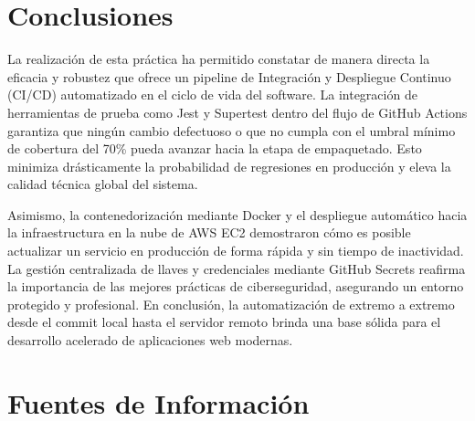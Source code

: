 \documentclass[12pt,letterpaper]{article}
\begin{document}
\newpage

\section{Conclusiones}

La realización de esta práctica ha permitido constatar de manera directa la eficacia y robustez que ofrece un pipeline de Integración y Despliegue Continuo (CI/CD) automatizado en el ciclo de vida del software. La integración de herramientas de prueba como Jest y Supertest dentro del flujo de GitHub Actions garantiza que ningún cambio defectuoso o que no cumpla con el umbral mínimo de cobertura del 70\% pueda avanzar hacia la etapa de empaquetado. Esto minimiza drásticamente la probabilidad de regresiones en producción y eleva la calidad técnica global del sistema.

Asimismo, la contenedorización mediante Docker y el despliegue automático hacia la infraestructura en la nube de AWS EC2 demostraron cómo es posible actualizar un servicio en producción de forma rápida y sin tiempo de inactividad. La gestión centralizada de llaves y credenciales mediante GitHub Secrets reafirma la importancia de las mejores prácticas de ciberseguridad, asegurando un entorno protegido y profesional. En conclusión, la automatización de extremo a extremo desde el commit local hasta el servidor remoto brinda una base sólida para el desarrollo acelerado de aplicaciones web modernas.

\newpage

\section{Fuentes de Información}
\end{document}
